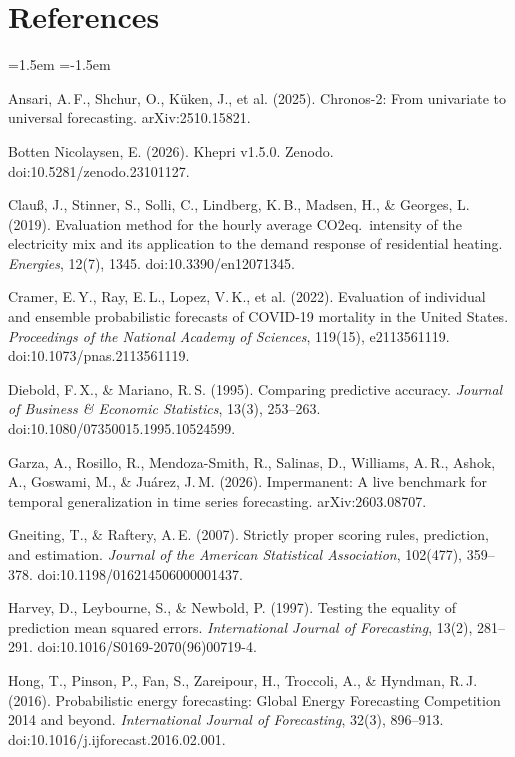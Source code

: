 \section*{References}
\begin{list}{}{\leftmargin=1.5em \itemindent=-1.5em \itemsep=2pt}
\item Ansari, A.\,F., Shchur, O., K\"uken, J., et al. (2025). Chronos-2: From univariate to universal forecasting. arXiv:2510.15821.
\item Botten Nicolaysen, E. (2026). Khepri v1.5.0. Zenodo. doi:10.5281/zenodo.23101127.
\item Clau\ss, J., Stinner, S., Solli, C., Lindberg, K.\,B., Madsen, H., \& Georges, L. (2019). Evaluation method for the hourly average CO2eq.\ intensity of the electricity mix and its application to the demand response of residential heating. \emph{Energies}, 12(7), 1345. doi:10.3390/en12071345.
\item Cramer, E.\,Y., Ray, E.\,L., Lopez, V.\,K., et al. (2022). Evaluation of individual and ensemble probabilistic forecasts of COVID-19 mortality in the United States. \emph{Proceedings of the National Academy of Sciences}, 119(15), e2113561119. doi:10.1073/pnas.2113561119.
\item Diebold, F.\,X., \& Mariano, R.\,S. (1995). Comparing predictive accuracy. \emph{Journal of Business \& Economic Statistics}, 13(3), 253--263. doi:10.1080/07350015.1995.10524599.
\item Garza, A., Rosillo, R., Mendoza-Smith, R., Salinas, D., Williams, A.\,R., Ashok, A., Goswami, M., \& Ju\'arez, J.\,M. (2026). Impermanent: A live benchmark for temporal generalization in time series forecasting. arXiv:2603.08707.
\item Gneiting, T., \& Raftery, A.\,E. (2007). Strictly proper scoring rules, prediction, and estimation. \emph{Journal of the American Statistical Association}, 102(477), 359--378. doi:10.1198/016214506000001437.
\item Harvey, D., Leybourne, S., \& Newbold, P. (1997). Testing the equality of prediction mean squared errors. \emph{International Journal of Forecasting}, 13(2), 281--291. doi:10.1016/S0169-2070(96)00719-4.
\item Hong, T., Pinson, P., Fan, S., Zareipour, H., Troccoli, A., \& Hyndman, R.\,J. (2016). Probabilistic energy forecasting: Global Energy Forecasting Competition 2014 and beyond. \emph{International Journal of Forecasting}, 32(3), 896--913. doi:10.1016/j.ijforecast.2016.02.001.

\end{list}

